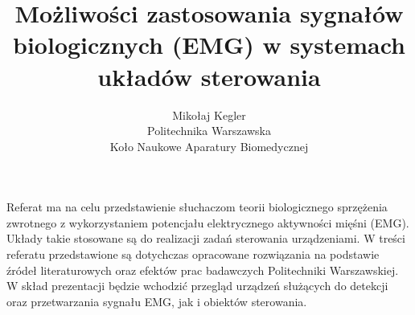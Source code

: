 \documentclass[12pt, a4paper]{article}
\begin{document}
\title{Możliwości zastosowania sygnałów biologicznych (EMG) w systemach układów sterowania}
\author{Mikołaj Kegler \\Politechnika Warszawska \\Koło Naukowe Aparatury Biomedycznej}
\date {}
\maketitle
\thispagestyle{title}
Referat ma na celu przedstawienie słuchaczom teorii biologicznego sprzężenia zwrotnego z wykorzystaniem potencjału elektrycznego aktywności mięśni (EMG). Układy takie stosowane są do realizacji zadań sterowania urządzeniami. W treści referatu przedstawione są dotychczas opracowane rozwiązania na podstawie źródeł literaturowych oraz efektów prac badawczych Politechniki Warszawskiej. W skład prezentacji będzie wchodzić przegląd urządzeń służących do detekcji oraz przetwarzania sygnału EMG, jak i obiektów sterowania.
\end{document}

